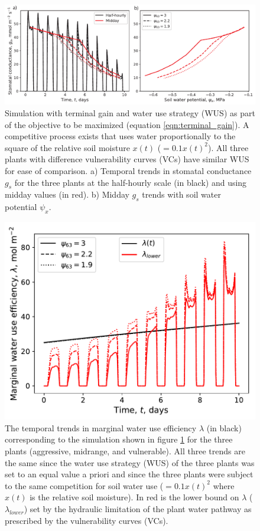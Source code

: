 \documentclass[utf8]{frontiersSCNS} %
\begin{document}
\begin{figure}[h]
    \centering
    \includegraphics[scale=0.75]{gs_resistant_vulnerable_competition_WUS.pdf}
    \caption{Simulation with terminal gain and water use strategy (WUS) as part of the objective to be maximized (equation \ref{eqn:terminal_gain}). A competitive process exists that uses water proportionally to the square of the relative soil moisture $x(t)$ ($= 0.1 x(t)^2$). All three plants with difference vulnerability curves (VCs) have similar WUS for ease of comparison. a) Temporal trends in stomatal conductance $g_s$ for the three plants at the half-hourly scale (in black) and using midday values (in red). b) Midday $g_s$ trends with soil water potential $\psi_x$.}
    \label{fig:resistant_vulnerable_gs_competition_WUS}
\end{figure}

\begin{figure}[h]
    \centering
    \includegraphics[scale=0.75]{lam_resistant_vulnerable_competition_WUS.pdf}
    \caption{The temporal trends in marginal water use efficiency $\lambda$ (in black) corresponding to the simulation shown in figure \ref{fig:resistant_vulnerable_gs_competition_WUS} for the three plants (aggressive, midrange, and vulnerable). All three trends are the same since the water use strategy (WUS) of the three plants was set to an equal value a priori and since the three plants were subject to the same competition for soil water use ($= 0.1 x(t)^2$ where $x(t)$ is the relative soil moisture). In red is the lower bound on $\lambda$ ($\lambda_{lower}$) set by the hydraulic limitation of the plant water pathway as prescribed by the vulnerability curves (VCs).}
    \label{fig:resistant_vulnerable_lam_competition_WUS}
\end{figure}
\end{document}
